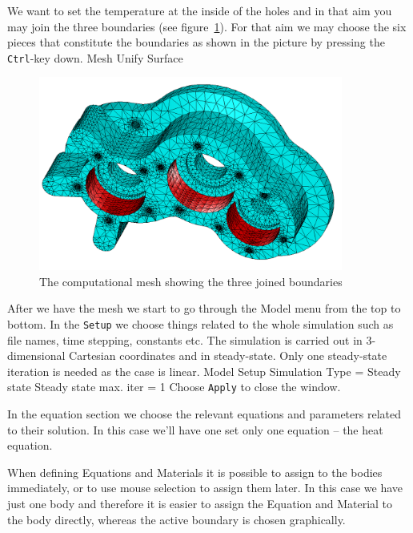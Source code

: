 We want to set the temperature at the inside of the holes and in that aim you may join the three boundaries (see figure~\ref{fg:bcs_chosen}).
For that aim we may choose the six pieces that constitute the boundaries as shown in the picture by pressing the \texttt{Ctrl}-key down.
\ttbegin
Mesh 
  Unify Surface
\ttend
\begin{figure}
\begin{center}
\includegraphics[width=100mm]{bcs_chosen}
\caption{The computational mesh showing the three joined boundaries}\label{fg:bcs_chosen}
\end{center}
\end{figure}

After we have the mesh we start to go through the Model menu from the top to bottom. 
In the \texttt{Setup} we choose things related to the whole simulation such as file names, 
time stepping, constants etc.
The simulation is carried out in 3-dimensional Cartesian
coordinates and in steady-state. 
Only one steady-state iteration is needed as the case is linear. 
\ttbegin
Model
  Setup 
    Simulation Type = Steady state
    Steady state max. iter = 1
\ttend
Choose \texttt{Apply} to close the window.

In the equation section we choose the relevant equations and parameters related to their solution. 
In this case we'll have one set only one equation -- the heat equation.

When defining Equations and Materials it is possible to assign to the bodies immediately, or to use mouse
selection to assign them later. In this case we have just one body and therefore it is easier to assign 
the Equation and Material to the body directly, whereas the active boundary is chosen graphically.

